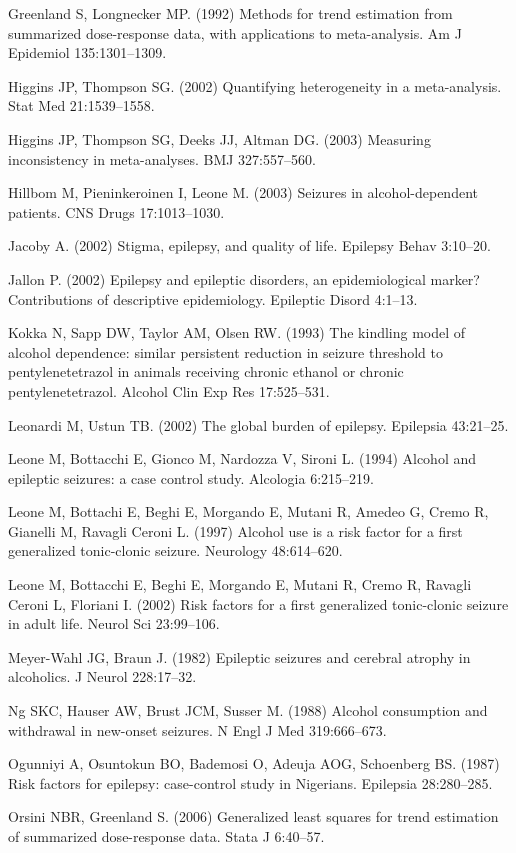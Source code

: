\documentclass{article}
\begin{document}
Greenland S, Longnecker MP. (1992) Methods for trend estimation from summarized dose-response data, with applications to meta-analysis. Am J Epidemiol 135:1301–1309.

Higgins JP, Thompson SG. (2002) Quantifying heterogeneity in a meta-analysis. Stat Med 21:1539–1558.

Higgins JP, Thompson SG, Deeks JJ, Altman DG. (2003) Measuring inconsistency in meta-analyses. BMJ 327:557–560.

Hillbom M, Pieninkeroinen I, Leone M. (2003) Seizures in alcohol-dependent patients. CNS Drugs 17:1013–1030.

Jacoby A. (2002) Stigma, epilepsy, and quality of life. Epilepsy Behav 3:10–20.

Jallon P. (2002) Epilepsy and epileptic disorders, an epidemiological marker? Contributions of descriptive epidemiology. Epileptic Disord 4:1–13.

Kokka N, Sapp DW, Taylor AM, Olsen RW. (1993) The kindling model of alcohol dependence: similar persistent reduction in seizure threshold to pentylenetetrazol in animals receiving chronic ethanol or chronic pentylenetetrazol. Alcohol Clin Exp Res 17:525–531.

Leonardi M, Ustun TB. (2002) The global burden of epilepsy. Epilepsia 43:21–25.

Leone M, Bottacchi E, Gionco M, Nardozza V, Sironi L. (1994) Alcohol and epileptic seizures: a case control study. Alcologia 6:215–219.

Leone M, Bottachi E, Beghi E, Morgando E, Mutani R, Amedeo G, Cremo R, Gianelli M, Ravagli Ceroni L. (1997) Alcohol use is a risk factor for a first generalized tonic-clonic seizure. Neurology 48:614–620.

Leone M, Bottacchi E, Beghi E, Morgando E, Mutani R, Cremo R, Ravagli Ceroni L, Floriani I. (2002) Risk factors for a first generalized tonic-clonic seizure in adult life. Neurol Sci 23:99–106.

Meyer-Wahl JG, Braun J. (1982) Epileptic seizures and cerebral atrophy in alcoholics. J Neurol 228:17–32.

Ng SKC, Hauser AW, Brust JCM, Susser M. (1988) Alcohol consumption and withdrawal in new-onset seizures. N Engl J Med 319:666–673.

Ogunniyi A, Osuntokun BO, Bademosi O, Adeuja AOG, Schoenberg BS. (1987) Risk factors for epilepsy: case-control study in Nigerians. Epilepsia 28:280–285.

Orsini NBR, Greenland S. (2006) Generalized least squares for trend estimation of summarized dose-response data. Stata J 6:40–57.
\end{document}
